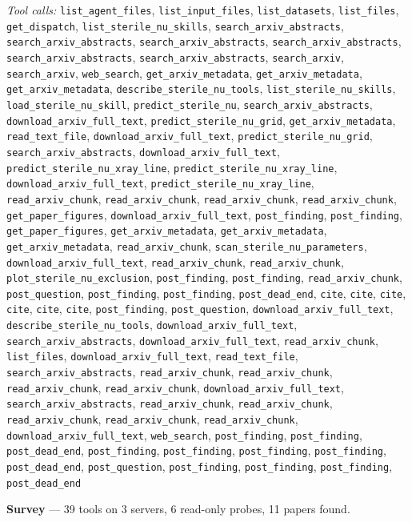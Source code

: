 \documentclass[11pt,a4paper]{article}
\begin{document}
\textit{Tool calls:} \texttt{list\_agent\_files}, \texttt{list\_input\_files}, \texttt{list\_datasets}, \texttt{list\_files}, \texttt{get\_dispatch}, \texttt{list\_sterile\_nu\_skills}, \texttt{search\_arxiv\_abstracts}, \texttt{search\_arxiv\_abstracts}, \texttt{search\_arxiv\_abstracts}, \texttt{search\_arxiv\_abstracts}, \texttt{search\_arxiv\_abstracts}, \texttt{search\_arxiv\_abstracts}, \texttt{search\_arxiv}, \texttt{search\_arxiv}, \texttt{web\_search}, \texttt{get\_arxiv\_metadata}, \texttt{get\_arxiv\_metadata}, \texttt{get\_arxiv\_metadata}, \texttt{describe\_sterile\_nu\_tools}, \texttt{list\_sterile\_nu\_skills}, \texttt{load\_sterile\_nu\_skill}, \texttt{predict\_sterile\_nu}, \texttt{search\_arxiv\_abstracts}, \texttt{download\_arxiv\_full\_text}, \texttt{predict\_sterile\_nu\_grid}, \texttt{get\_arxiv\_metadata}, \texttt{read\_text\_file}, \texttt{download\_arxiv\_full\_text}, \texttt{predict\_sterile\_nu\_grid}, \texttt{search\_arxiv\_abstracts}, \texttt{download\_arxiv\_full\_text}, \texttt{predict\_sterile\_nu\_xray\_line}, \texttt{predict\_sterile\_nu\_xray\_line}, \texttt{download\_arxiv\_full\_text}, \texttt{predict\_sterile\_nu\_xray\_line}, \texttt{read\_arxiv\_chunk}, \texttt{read\_arxiv\_chunk}, \texttt{read\_arxiv\_chunk}, \texttt{read\_arxiv\_chunk}, \texttt{get\_paper\_figures}, \texttt{download\_arxiv\_full\_text}, \texttt{post\_finding}, \texttt{post\_finding}, \texttt{get\_paper\_figures}, \texttt{get\_arxiv\_metadata}, \texttt{get\_arxiv\_metadata}, \texttt{get\_arxiv\_metadata}, \texttt{read\_arxiv\_chunk}, \texttt{scan\_sterile\_nu\_parameters}, \texttt{download\_arxiv\_full\_text}, \texttt{read\_arxiv\_chunk}, \texttt{read\_arxiv\_chunk}, \texttt{plot\_sterile\_nu\_exclusion}, \texttt{post\_finding}, \texttt{post\_finding}, \texttt{read\_arxiv\_chunk}, \texttt{post\_question}, \texttt{post\_finding}, \texttt{post\_finding}, \texttt{post\_dead\_end}, \texttt{cite}, \texttt{cite}, \texttt{cite}, \texttt{cite}, \texttt{cite}, \texttt{cite}, \texttt{post\_finding}, \texttt{post\_question}, \texttt{download\_arxiv\_full\_text}, \texttt{describe\_sterile\_nu\_tools}, \texttt{download\_arxiv\_full\_text}, \texttt{search\_arxiv\_abstracts}, \texttt{download\_arxiv\_full\_text}, \texttt{read\_arxiv\_chunk}, \texttt{list\_files}, \texttt{download\_arxiv\_full\_text}, \texttt{read\_text\_file}, \texttt{search\_arxiv\_abstracts}, \texttt{read\_arxiv\_chunk}, \texttt{read\_arxiv\_chunk}, \texttt{read\_arxiv\_chunk}, \texttt{read\_arxiv\_chunk}, \texttt{download\_arxiv\_full\_text}, \texttt{search\_arxiv\_abstracts}, \texttt{read\_arxiv\_chunk}, \texttt{read\_arxiv\_chunk}, \texttt{read\_arxiv\_chunk}, \texttt{read\_arxiv\_chunk}, \texttt{read\_arxiv\_chunk}, \texttt{download\_arxiv\_full\_text}, \texttt{web\_search}, \texttt{post\_finding}, \texttt{post\_finding}, \texttt{post\_dead\_end}, \texttt{post\_finding}, \texttt{post\_finding}, \texttt{post\_finding}, \texttt{post\_finding}, \texttt{post\_dead\_end}, \texttt{post\_question}, \texttt{post\_finding}, \texttt{post\_finding}, \texttt{post\_finding}, \texttt{post\_dead\_end}\par
\textbf{Survey} --- 39 tools on 3 servers, 6 read-only probes, 11 papers found.
\end{document}
